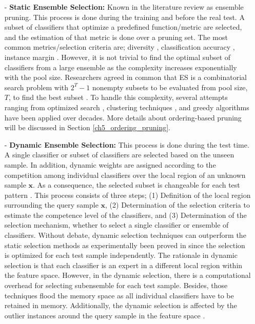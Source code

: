  
 \begin{itemize}
    \item[-]\textbf{Static Ensemble Selection:} Known in the literature review as ensemble pruning. This process is done during the training and before the real test. A subset of classifiers that optimize a predefined function/metric are selected, and the estimation of that metric is done over a pruning set. The most common metrics/selection criteria are; diversity \cite{aksela2003,brown2010}, classification accuracy \cite{dos2009,ruta2005}, instance margin \cite{yang2012, guo2013,hernandez2008}. However, it is not trivial to find the optimal subset of classifiers from a large ensemble as the complexity increases exponentially with the pool size. Researchers agreed in common that ES is a combinatorial search problem with $2^{T}-1$ nonempty subsets to be evaluated from pool size, $T$, to find the best subset \cite{tamon2000, tsoumakas2009}. To handle this complexity, several attempts ranging from optimized search \cite{diao2013,adnan2016,ruta2001b}, clustering techniques \cite{onan2017,zyblewski2020}, and greedy algorithms \cite{cao2018,martinez2009,margineantu1997, partalas2010, mao2011} have been applied over decades. More details about ordering-based pruning will be discussed in Section \ref{ch5_ordering_pruning}.        
    
     \item[-]\textbf{Dynamic Ensemble Selection:} This process is done during the test time. A single classifier or subset of classifiers are selected based on the unseen sample. In addition, dynamic weights are assigned according to the competition among individual classifiers over the local region of an unknown sample $\textbf{x}$. As a consequence, the selected subset is changeable for each test pattern \cite{KO2008}. This process consists of three steps; (1) Definition of the local region surrounding the query sample $\textbf{x}$, (2) Determination of the selection criteria to estimate the competence level of the classifiers, and (3) Determination of the selection mechanism, whether to select a single classifier or ensemble of classifiers. Without debate, dynamic selection techniques can outperform the static selection methods as experimentally been proved in \cite{cruz2018} since the selection is optimized for each test sample independently. The rationale in dynamic selection is that each classifier is an expert in a different local region within the feature space. However, in the dynamic selection, there is a computational overhead for selecting subensemble for each test sample. Besides, those techniques flood the memory space as all individual classifiers have to be retained in memory. Additionally, the dynamic selection is affected by the outlier instances around the query sample in the feature space \cite{CRUZ2015}.
    
\end{itemize}


